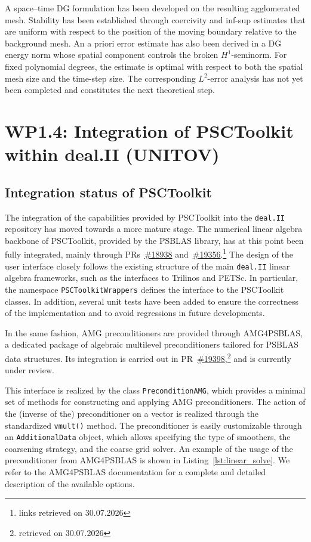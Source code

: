 \documentclass[a4paper,12pt]{article}
\begin{document}
A space–time DG formulation has been developed on the resulting agglomerated mesh. Stability has been established through coercivity and inf-sup estimates that are uniform with respect to the position of the moving boundary relative to the background mesh. An a priori error estimate has also been derived in a DG energy norm whose spatial component controls the broken $H^1$-seminorm. For fixed polynomial degrees, the estimate is optimal with respect to both the spatial mesh size and the time-step size. The corresponding $L^2$-error analysis has not yet been completed and constitutes the next theoretical step.



\newpage

\section{WP1.4: Integration of PSCToolkit within deal.II (UNITOV)}
\label{sec:unitov}

\subsection{Integration status of PSCToolkit}
The integration of the capabilities provided by PSCToolkit into the \texttt{deal.II} repository has moved
towards a more mature stage. The numerical linear algebra backbone of PSCToolkit, provided by the PSBLAS library, has
at this point been fully integrated, mainly through PRs~\href{https://github.com/dealii/dealii/pull/18938}{\#18938} and~\href{https://github.com/dealii/dealii/pull/19356}{\#19356}.\footnote{links retrieved on 30.07.2026} The design of the user interface
closely follows the existing structure of the main \texttt{deal.II} linear algebra frameworks, such as the
interfaces to Trilinos and PETSc. In particular, the namespace \texttt{PSCToolkitWrappers} defines the
interface to the PSCToolkit classes. In addition, several unit tests have been added to ensure the correctness of the implementation
and to avoid regressions in future developments.

In the same fashion, AMG preconditioners are provided through AMG4PSBLAS, a dedicated package
of algebraic multilevel preconditioners tailored for PSBLAS data structures. Its integration is
carried out in PR~\href{https://github.com/dealii/dealii/pull/19398}{\#19398},\footnote{retrieved on 30.07.2026} and is currently under review.

This interface is realized by the class \texttt{PreconditionAMG}, which provides
a minimal set of methods for constructing and applying AMG preconditioners. The action of
the (inverse of the) preconditioner on a vector is realized through the standardized \texttt{vmult()} method. The preconditioner is easily customizable through an \texttt{AdditionalData} object, which allows specifying the
type of smoothers, the coarsening strategy, and the coarse grid solver. An example of the usage of the preconditioner from AMG4PSBLAS is shown in Listing~\ref{lst:linear_solve}.
We refer to the AMG4PSBLAS documentation for a complete and detailed description of the available options.
\end{document}
